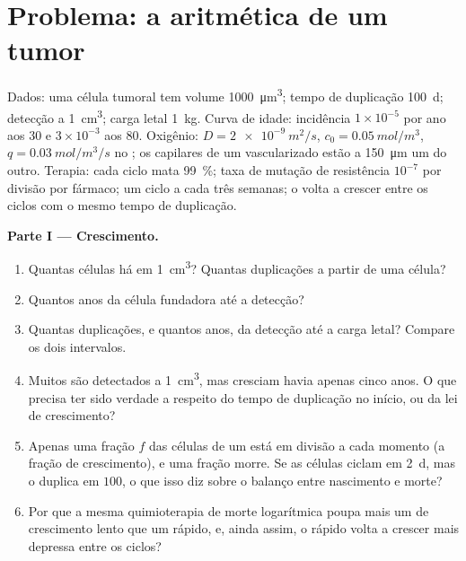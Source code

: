 \section{Problema: a aritmética de um tumor}

\begin{problem}
\label{pb:b3:cancer-biology:1}
Dados: uma célula tumoral tem volume \qty{1000}{\micro m^3}; tempo de
duplicação \qty{100}{d}; detecção a \qty{1}{cm^3}; carga letal
\qty{1}{kg}. Curva de idade: incidência $1\times 10^{-5}$ por ano aos
$30$ e $3\times
10^{-3}$ aos $80$. Oxigênio: $D = \qty{2e-9}{m^2/s}$,
$c_{0} =
\qty{0.05}{mol/m^3}$, $q = \qty{0.03}{mol/m^3/s}$ no ; os
capilares de um  vascularizado estão a \qty{150}{\micro m} um do
outro. Terapia: cada ciclo mata \qty{99}{\%}; taxa de mutação de
resistência $10^{-7}$ por divisão por fármaco; um ciclo a cada três
semanas; o  volta a crescer entre os ciclos com o mesmo tempo de
duplicação.

\medskip
\noindent\textbf{Parte I --- Crescimento.}
\begin{enumerate}
  \item Quantas células há em \qty{1}{cm^3}? Quantas duplicações a
        partir de uma célula?
  \item Quantos anos da célula fundadora até a detecção?
  \item Quantas duplicações, e quantos anos, da detecção até a carga
        letal? Compare os dois intervalos.
  \item Muitos  são detectados a \qty{1}{cm^3}, mas cresciam
        havia apenas cinco anos. O que precisa ter sido verdade a
        respeito do tempo de duplicação no início, ou da lei de
        crescimento?
  \item Apenas uma fração $f$ das células de um  está em divisão a
        cada momento (a fração de crescimento), e uma fração morre. Se
        as células ciclam em \qty{2}{d}, mas o  duplica em
        $100$, o que isso diz sobre o balanço entre nascimento e morte?
  \item Por que a mesma quimioterapia de morte logarítmica poupa mais
        um  de crescimento lento que um rápido, e, ainda assim, o
        rápido volta a crescer mais depressa entre os ciclos?
\end{enumerate}


\end{problem}
